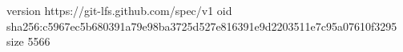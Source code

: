 version https://git-lfs.github.com/spec/v1
oid sha256:c5967ec5b680391a79e98ba3725d527e816391e9d2203511e7c95a07610f3295
size 5566

